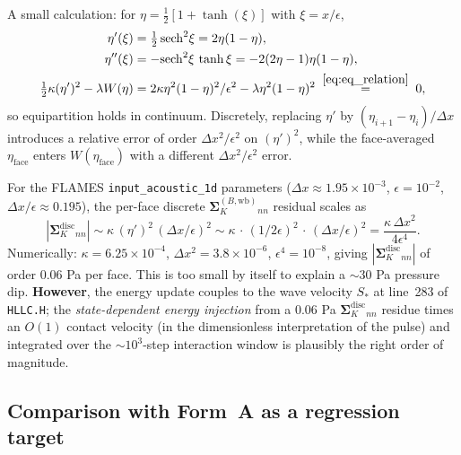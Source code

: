 \documentclass[11pt]{article}
\newcommand{\SK}{\boldsymbol{\Sigma}_K}
\begin{document}
A small calculation: for $\eta = \tfrac12[1+\tanh(\xi)]$ with $\xi=x/\epsilon$,
\begin{align}
\eta'(\xi) &= \tfrac12\,\mathrm{sech}^2\xi = 2\eta(1-\eta), \\
\eta''(\xi) &= -\mathrm{sech}^2\xi\,\tanh\xi = -2(2\eta-1)\eta(1-\eta), \\
\tfrac12\kappa(\eta')^2 - \lambda W(\eta)
   &= 2\kappa\eta^2(1-\eta)^2/\epsilon^2 - \lambda\eta^2(1-\eta)^2
   \;\stackrel{\eqref{eq:eq_relation}}{=}\; 0,
\end{align}
so equipartition holds in continuum. Discretely, replacing $\eta'$ by
$(\eta_{i+1}-\eta_i)/\Delta x$ introduces a relative error of order
$\Delta x^2/\epsilon^2$ on $(\eta')^2$, while the face-averaged
$\eta_{\mathrm{face}}$ enters $W(\eta_{\mathrm{face}})$ with a different
$\Delta x^2/\epsilon^2$ error.

For the FLAMES \texttt{input\_acoustic\_1d} parameters
($\Delta x \approx 1.95\!\times\!10^{-3}$, $\epsilon=10^{-2}$,
$\Delta x/\epsilon \approx 0.195$), the per-face discrete $\SK^{(B,\mathrm{wb})}_{nn}$ residual scales as
\begin{equation}
|\SK^{\mathrm{disc}}_{nn}|
 \sim \kappa\,(\eta')^2\,(\Delta x/\epsilon)^2
 \sim \kappa\,\cdot\,(1/2\epsilon)^2\,\cdot\,(\Delta x/\epsilon)^2
 = \frac{\kappa\,\Delta x^2}{4\epsilon^4}.
\label{eq:dscale}
\end{equation}
Numerically: $\kappa=6.25\!\times\!10^{-4}$, $\Delta x^2 = 3.8\!\times\!10^{-6}$,
$\epsilon^4 = 10^{-8}$, giving $|\SK^{\mathrm{disc}}_{nn}|$ of order
$0.06$ Pa per face. This is too small by itself to explain a $\sim 30$ Pa
pressure dip. \textbf{However}, the energy update couples to the wave
velocity $S_*$ at line~283 of \texttt{HLLC.H}; the
\emph{state-dependent energy injection} from a $0.06$ Pa
$\SK^{\mathrm{disc}}_{nn}$ residue times an $O(1)$ contact velocity (in
the dimensionless interpretation of the pulse) and integrated over the
$\sim 10^3$-step interaction window is plausibly the right order of
magnitude.

\subsection{Comparison with Form~A as a regression target}
\end{document}
